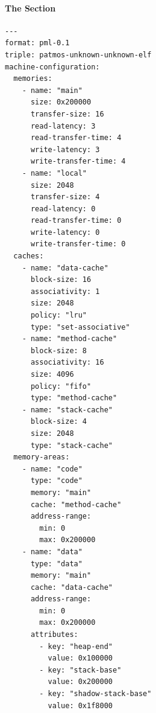 \paragraph{The  Section}


\begin{verbatim}
---
format: pml-0.1
triple: patmos-unknown-unknown-elf
machine-configuration:
  memories:
    - name: "main"
      size: 0x200000
      transfer-size: 16
      read-latency: 3
      read-transfer-time: 4
      write-latency: 3
      write-transfer-time: 4
    - name: "local"
      size: 2048
      transfer-size: 4
      read-latency: 0
      read-transfer-time: 0
      write-latency: 0
      write-transfer-time: 0
  caches:
    - name: "data-cache"
      block-size: 16
      associativity: 1
      size: 2048
      policy: "lru"
      type: "set-associative"
    - name: "method-cache"
      block-size: 8
      associativity: 16
      size: 4096
      policy: "fifo"
      type: "method-cache"
    - name: "stack-cache"
      block-size: 4
      size: 2048
      type: "stack-cache"
  memory-areas:
    - name: "code"
      type: "code"
      memory: "main"
      cache: "method-cache"
      address-range:
        min: 0
        max: 0x200000
    - name: "data"
      type: "data"
      memory: "main"
      cache: "data-cache"
      address-range:
        min: 0
        max: 0x200000
      attributes:
        - key: "heap-end"
          value: 0x100000
        - key: "stack-base"
          value: 0x200000
        - key: "shadow-stack-base"
          value: 0x1f8000
\end{verbatim}


